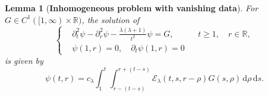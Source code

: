 \documentclass[11pt,twoside]{article}
\newcommand{\R}{\mathbb R}
\newcommand{\p}{\partial}
\newcommand{\f}{\frac}
\newcommand{\dd}{\,\mathrm{d}}
\newcommand{\Ecal}{\mathcal E}
\theoremstyle{plain}
\newtheorem{lemma}[theorem]{Lemma}
\theoremstyle{definition}
\theoremstyle{remark}
\numberwithin{equation}{section}
\begin{document}
\begin{lemma}[{\bf Inhomogeneous problem with vanishing data}]
\label{lem:inhomogeneous-representation}
For $G\in C^1([1,\infty)\times\R)$, the solution of
\begin{equation}
\label{eq:inhom-linear}
\left\{
\begin{aligned}
&\p_t^2\psi-\p_r^2\psi-\f{\lambda(\lambda+1)}{t^2}\psi=G,
&&t\geq1,\quad r\in\R,\\
&\psi(1,r)=0,\quad \p_t\psi(1,r)=0
\end{aligned}
\right.
\end{equation}
is given by
\begin{equation}
\label{eq:inhom-representation}
\psi(t,r)
=c_\lambda\int_1^t
\int_{r-(t-s)}^{r+(t-s)}
\Ecal_\lambda(t,s,r-\rho)G(s,\rho)\dd\rho\dd s.
\end{equation}
\end{lemma}
\end{document}
